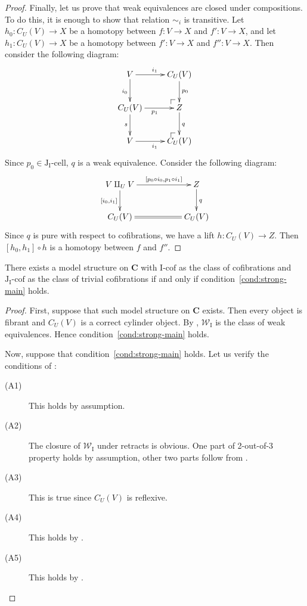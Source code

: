 \documentclass[reqno]{amsart}
\makeatletter
\theoremstyle{definition}
\newcommand{\we}{\mathcal{W}}
\newcommand{\cat}[1]{\mathbf{#1}}
\newcommand{\C}{\cat{C}}
\newcommand{\I}{\mathrm{I}}
\newcommand{\J}{\mathrm{J}}
\newcommand{\class}[2]{#1\text{-}\mathrm{#2}}
\newcommand{\Icell}[1][\I]{\class{#1}{cell}}
\newcommand{\Icof}[1][\I]{\class{#1}{cof}}
\newcommand{\Jcell}[1][]{\Icell[\J#1]}
\newcommand{\Jcof}[1][]{\Icof[\J#1]}
\newcommand{\cyli}{i}
\newcommand{\po}[1][dr]{\save*!/#1+1.2pc/#1:(1,-1)@^{|-}\restore}
\makeatother
\begin{document}
\begin{proof}
Finally, let us prove that weak equivalences are closed under compositions.
To do this, it is enough to show that relation $\sim_i$ is transitive.
Let $h_0 : C_U(V) \to X$ be a homotopy between $f : V \to X$ and $f' : V \to X$, and
let $h_1 : C_U(V) \to X$ be a homotopy between $f' : V \to X$ and $f'' : V \to X$.
Then consider the following diagram:
\[ \xymatrix{ V \ar[r]^{\cyli_1} \ar[d]_{\cyli_0} & C_U(V) \ar[d]^{p_0} \\
              C_U(V) \ar[r]_{p_1} \ar[d]_s & \po Z \ar[d]^q \\
              V \ar[r]_{\cyli_1} & \po C_U(V)
            } \]
Since $p_0 \in \Jcell[_\I]$, $q$ is a weak equivalence.
Consider the following diagram:
\[ \xymatrix{ V \amalg_U V \ar[rr]^-{[p_0 \circ \cyli_0, p_1 \circ \cyli_1]} \ar[d]_{[\cyli_0,\cyli_1]} & & Z \ar[d]^q \\
              C_U(V) \ar@{=}[rr] & & C_U(V)
            } \]
Since $q$ is pure with respect to cofibrations, we have a lift $h : C_U(V) \to Z$.
Then $[h_0,h_1] \circ h$ is a homotopy between $f$ and $f''$.
\end{proof}

\begin{thm}[main]
There exists a model structure on $\C$ with $\Icof$ as the class of cofibrations and $\Jcof[_\I]$ as the class of trivial cofibrations
if and only if condition~\eqref{cond:strong-main} holds.
\end{thm}
\begin{proof}
First, suppose that such model structure on $\C$ exists.
Then every object is fibrant and $C_U(V)$ is a correct cylinder object.
By , $\we_\I$ is the class of weak equivalences.
Hence condition~\eqref{cond:strong-main} holds.

Now, suppose that condition~\eqref{cond:strong-main} holds.
Let us verify the conditions of :
\begin{description}
\item[(A1)] This holds by assumption.
\item[(A2)] The closure of $\we_\I$ under retracts is obvious.
One part of 2-out-of-3 property holds by assumption, other two parts follow from .
\item[(A3)] This is true since $C_U(V)$ is reflexive.
\item[(A4)] This holds by .
\item[(A5)] This holds by .
\end{description}
\end{proof}
\end{document}
